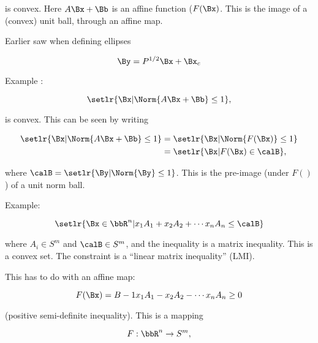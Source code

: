is convex.  Here \( A \Bx + \Bb \) is an affine function (\(F(\Bx)\).  This is the image of a (convex) unit ball, through an affine map.

Earlier saw when defining ellipses

\begin{equation}\label{eqn:convexOptimizationLecture5:160}
\By = P^{1/2} \Bx + \Bx_c
\end{equation}

Example :

\begin{equation}\label{eqn:convexOptimizationLecture5:180}
\setlr{ \Bx | \Norm{ A \Bx + \Bb } \le 1 },
\end{equation}

is convex.  This can be seen by writing

\begin{equation}\label{eqn:convexOptimizationLecture5:200}
\begin{aligned}
\setlr{ \Bx | \Norm{ A \Bx + \Bb } \le 1 }
&=
\setlr{ \Bx | \Norm{ F(\Bx) } \le 1 } \\
&=
\setlr{ \Bx | F(\Bx) \in \calB  },
\end{aligned}
\end{equation}

where \( \calB = \setlr{ \By | \Norm{\By} \le 1 } \).  This is the pre-image (under \(F()\)) of a unit norm ball.

Example:

\begin{equation}\label{eqn:convexOptimizationLecture5:220}
\setlr{ \Bx \in \bbR^n | x_1 A_1 + x_2 A_2 + \cdots x_n A_n \le \calB }
\end{equation}

where \( A_i \in S^m \) and \( \calB \in S^m \), and the inequality is a matrix inequality.  This is a convex set.  The constraint is a ``linear matrix inequality'' (LMI).

This has to do with an affine map:

\begin{equation}\label{eqn:convexOptimizationLecture5:240}
F(\Bx) = B - 1 x_1 A_1 - x_2 A_2 - \cdots x_n A_n \ge 0
\end{equation}

(positive semi-definite inequality).  This is a mapping

\begin{equation}\label{eqn:convexOptimizationLecture5:480}
F : \bbR^n \rightarrow S^m,
\end{equation}


